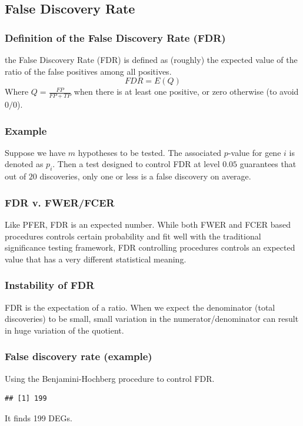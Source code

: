 \subsection{False Discovery Rate}
\begin{frame}
  \frametitle{Definition of the False Discovery Rate (FDR)} the False
  Discovery Rate (FDR) is defined as (roughly) the expected value of
  the ratio of the false positives among all positives.
  \begin{equation}
    \label{eq:fdr}
    FDR = E(Q)
  \end{equation}
  Where $Q=\frac{FP}{FP+TP}$ when there is at least one positive, or
  zero otherwise (to avoid $0/0$).
\end{frame}
\begin{frame}
  \frametitle{Example} Suppose we have $m$ hypotheses to be
  tested. The associated $p$-value for gene $i$ is denoted as
  $p_i$. Then a test designed to control FDR at level $0.05$
  guarantees that out of $20$ discoveries, only one or less is a false
  discovery on average.
\end{frame}
\begin{frame}
  \frametitle{FDR v. FWER/FCER} Like PFER, FDR is an \alert{expected
    number}. While both FWER and FCER based procedures controls
  certain \alert{probability} and fit well with the traditional
  significance testing framework, FDR controlling procedures controls
  an expected value that has a very different statistical meaning.
\end{frame}
\begin{frame}
  \frametitle{Instability of FDR} FDR is the expectation of a
  ratio. When we expect the denominator (total discoveries) to be
  small, small variation in the numerator/denominator can result in
  huge variation of the quotient.
\end{frame}

\begin{frame}[fragile]
  \frametitle{False discovery rate (example)}
Using the Benjamini-Hochberg procedure to control FDR.
\begin{knitrout}\footnotesize
{}\color{fgcolor}\begin{kframe}
\begin{alltt}
 \hlkwb{<-}  \hlstd{)}
\hlopt{<}\hlstd{)}
\end{alltt}
\begin{verbatim}
## [1] 199
\end{verbatim}
\end{kframe}
\end{knitrout}
It finds 199 DEGs.
\end{frame}

